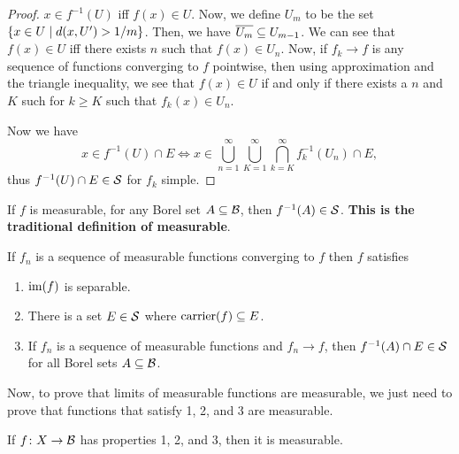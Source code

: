 \begin{proof}
    $x \in f^{-1}(U)$ iff $f(x) \in U$. Now, we define $U_m$ to be the set $\qty{x \in U \mid d(x, U') > 1/m}$. Then, we have $\overline{U_m} \subseteq U_{m - 1}$. We can see that $f(x) \in U$ iff there exists $n$ such that $f(x) \in U_n$. Now, if $f_k \to f$ is any sequence of functions converging to $f$ pointwise, then using approximation and the triangle inequality, we see that $f(x) \in U$ if and only if there exists a $n$ and $K$ such for $k \ge K$ such that $f_k(x) \in U_n$.

    Now we have \[x \in f^{-1}(U) \cap E\iff x \in \bigcup_{n = 1}^\infty \bigcup_{K = 1}^\infty \bigcap_{k = K}^\infty f_k^{-1}(U_n) \cap E,\] thus $f^{-1}(U) \cap E \in \mathcal S$ for $f_k$ simple.
\end{proof}

\begin{corollary}
    If $f$ is measurable, for any Borel set $A \subseteq \mathcal B$, then $f^{-1}(A) \in \mathcal S$. \textbf{This is the traditional definition of measurable}.
\end{corollary}

\begin{corollary}
    If $f_n$ is a sequence of measurable functions converging to $f$ then $f$ satisfies
    \begin{enumerate}
        \item $\operatorname{im}(f)$ is separable.
        \item There is a set $E \in \mathcal S$ where $\operatorname{carrier}(f) \subseteq E$.
        \item If $f_n$ is a sequence of measurable functions and $f_n \to f$, then $f^{-1}(A) \cap E\in \mathcal S$ for all Borel sets $A \subseteq \mathcal B$. 
    \end{enumerate}
\end{corollary}

Now, to prove that limits of measurable functions are measurable, we just need to prove that functions that satisfy 1, 2, and 3 are measurable.

\begin{theorem}
    If $f \colon X \to \mathcal B$ has properties 1, 2, and 3, then it is measurable.
\end{theorem}

